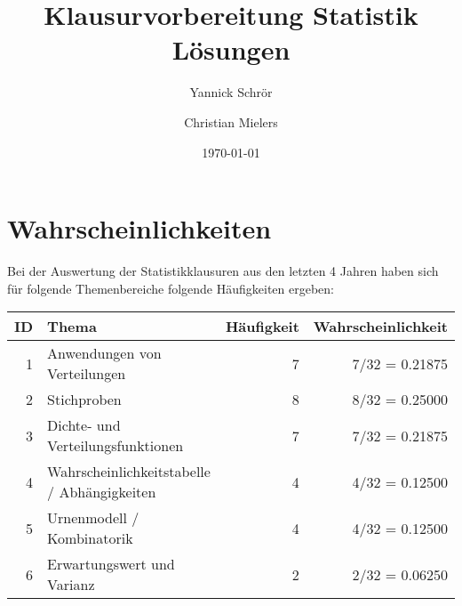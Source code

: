 \documentclass[11pt, a4paper]{article}
\title{Klausurvorbereitung Statistik \\ Lösungen}
\author{Yannick Schrör \and Christian Mielers}
\date{\today}
\begin{document}
\maketitle
\section{Wahrscheinlichkeiten}
Bei der Auswertung der Statistikklausuren aus den letzten 4 Jahren haben sich für folgende Themenbereiche folgende Häufigkeiten ergeben:\\

\begin{tabular}{r|l|r|r}
	ID 	&	Thema 										& Häufigkeit 	& Wahrscheinlichkeit\\ \hline
	1	& Anwendungen von Verteilungen 					& 7 			& 7/32 = 0.21875\\
	2	& Stichproben 									& 8				& 8/32 = 0.25000\\
	3	& Dichte- und Verteilungsfunktionen 			& 7 			& 7/32 = 0.21875\\
	4	& Wahrscheinlichkeitstabelle / Abhängigkeiten 	& 4 			& 4/32 = 0.12500\\
	5	& Urnenmodell / Kombinatorik 					& 4 			& 4/32 = 0.12500\\
	6	& Erwartungswert und Varianz 					& 2 			& 2/32 = 0.06250\\
\end{tabular}\\
\end{document}
